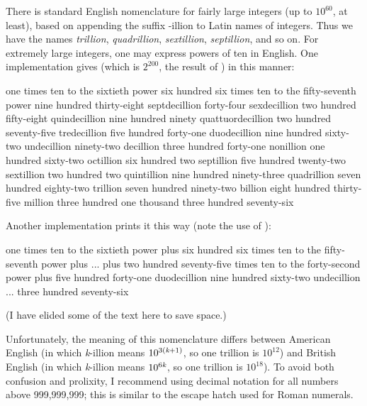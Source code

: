 \begin{flushdesc}
\begin{new}
There is standard English nomenclature for fairly large integers (up to $10^60$,
at least), based on appending the suffix -illion to Latin names of integers.
Thus we have the names \emph{trillion}, \emph{quadrillion}, \emph{sextillion},
\emph{septillion}, and so on.  For extremely large integers, one may express powers
of ten in English.
One implementation gives
(which is $2^{200}$, the result of )
in this manner:
\begin{flushleft}
\small \cf
one times ten to the sixtieth power six hundred six times ten to the
fifty-seventh power nine hundred thirty-eight septdecillion forty-four
sexdecillion two hundred fifty-eight quindecillion nine hundred ninety
quattuordecillion two hundred seventy-five tredecillion five hundred forty-one
duodecillion nine hundred sixty-two undecillion ninety-two decillion three
hundred forty-one nonillion one hundred sixty-two octillion six hundred two
septillion five hundred twenty-two sextillion two hundred two quintillion nine
hundred ninety-three quadrillion seven hundred eighty-two trillion seven hundred
ninety-two billion eight hundred thirty-five million three hundred one thousand
three hundred seventy-six
\end{flushleft}
Another implementation prints it this way (note the use of ):
\begin{flushleft}
\small \cf
one times ten to the sixtieth power plus six hundred six times ten to the fifty-seventh power plus
... plus two hundred seventy-five times ten to the
forty-second power plus five hundred forty-one duodecillion nine hundred sixty-two undecillion
...  three hundred seventy-six
\end{flushleft}
(I have elided some of the text here to save space.)

Unfortunately, the meaning of this nomenclature differs between American English (in which {\it
k}-illion means $10^{3(\hbox{\scriptsize\it k}+1)}$, so one trillion is $10^{12}$) and British English (in which {\it
k}-illion means $10^{6\hbox{\scriptsize\it k}}$, so one trillion is $10^{18}$).
To avoid both confusion and prolixity, 
I recommend using decimal notation for all numbers above 999,999,999;
this is similar to the escape hatch used for Roman numerals.
\end{new}


\end{flushdesc}
